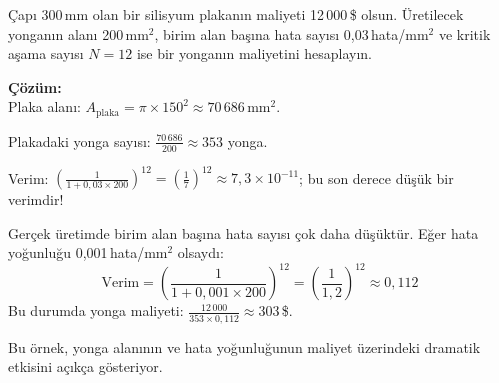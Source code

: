 \begin{ornek}[1.3]
Çapı 300\,mm olan bir silisyum plakanın maliyeti 12\,000\,\$ olsun. Üretilecek yonganın alanı 200\,mm$^2$, birim alan başına hata sayısı 0{,}03\,hata/mm$^2$ ve kritik aşama sayısı $N=12$ ise bir yonganın maliyetini hesaplayın.

\textbf{Çözüm:}\\
Plaka alanı: $A_\text{plaka} = \pi \times 150^2 \approx 70\,686$\,mm$^2$.

Plakadaki yonga sayısı: $\displaystyle\frac{70\,686}{200} \approx 353$ yonga.

Verim: $\displaystyle\left(\frac{1}{1 + 0{,}03 \times 200}\right)^{12} = \left(\frac{1}{7}\right)^{12} \approx 7{,}3 \times 10^{-11}$; bu son derece düşük bir verimdir!

Gerçek üretimde birim alan başına hata sayısı çok daha düşüktür. Eğer hata yoğunluğu 0{,}001\,hata/mm$^2$ olsaydı:
\[
\text{Verim} = \left(\frac{1}{1 + 0{,}001 \times 200}\right)^{12} = \left(\frac{1}{1{,}2}\right)^{12} \approx 0{,}112
\]
Bu durumda yonga maliyeti: $\displaystyle\frac{12\,000}{353 \times 0{,}112} \approx 303$\,\$.

Bu örnek, yonga alanının ve hata yoğunluğunun maliyet üzerindeki dramatik etkisini açıkça gösteriyor.
\end{ornek}

